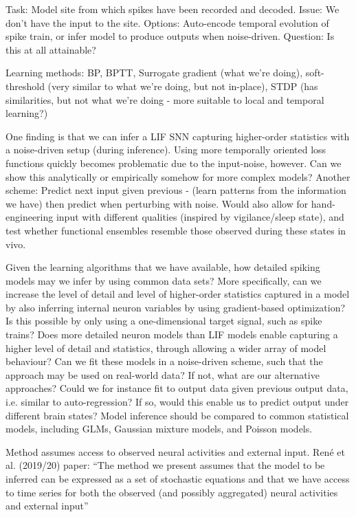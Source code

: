 \documentclass[mphil,deptreport,ai]{infthesis} %
\begin{document}
Task: Model site from which spikes have been recorded and decoded. Issue: We don’t have the input to the site. Options: Auto-encode temporal evolution of spike train, or infer model to produce outputs when noise-driven. Question: Is this at all attainable?

Learning methods:
BP, BPTT, Surrogate gradient (what we’re doing), soft-threshold (very similar to what we’re doing, but not in-place), STDP (has similarities, but not what we’re doing - more suitable to local and temporal learning?)

One finding is that we can infer a LIF SNN capturing higher-order statistics with a noise-driven setup (during inference). Using more temporally oriented loss functions quickly becomes problematic due to the input-noise, however. Can we show this analytically or empirically somehow for more complex models?
Another scheme: Predict next input given previous - (learn patterns from the information we have) then predict when perturbing with noise. Would also allow for hand-engineering input with different qualities (inspired by vigilance/sleep state), and test whether functional ensembles resemble those observed during these states in vivo.

Given the learning algorithms that we have available, how detailed spiking models may we infer by using common data sets? More specifically, can we increase the level of detail and level of higher-order statistics captured in a model by also inferring internal neuron variables by using gradient-based optimization? Is this possible by only using a one-dimensional target signal, such as spike trains? Does more detailed neuron models than LIF models enable capturing a higher level of detail and statistics, through allowing a wider array of model behaviour? Can we fit these models in a noise-driven scheme, such that the approach may be used on real-world data? If not, what are our alternative approaches? Could we for instance fit to output data given previous output data, i.e. similar to auto-regression? If so, would this enable us to predict output under different brain states?
Model inference should be compared to common statistical models, including GLMs, Gaussian mixture models, and Poisson models.


Method assumes access to observed neural activities and external input.
René et al. (2019/20) paper:
“The method we present assumes that the model to be inferred can be expressed as a
set of stochastic equations and that we have access to time series for both the observed (and possibly aggregated) neural activities and external input”
\end{document}
